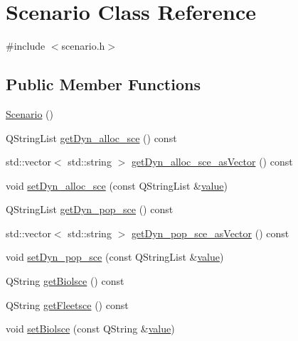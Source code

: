\hypertarget{class_scenario}{}\section{Scenario Class Reference}
\label{class_scenario}


{\ttfamily \#include $<$scenario.\+h$>$}

\subsection*{Public Member Functions}
\begin{DoxyCompactItemize}
\item 
\mbox{\hyperlink{class_scenario_ac81a05dad61b30116332ea971359a41e}{Scenario}} ()
\item 
Q\+String\+List \mbox{\hyperlink{class_scenario_a4a3f15933df62718ca13b64ffee96a08}{get\+Dyn\+\_\+alloc\+\_\+sce}} () const
\item 
std\+::vector$<$ std\+::string $>$ \mbox{\hyperlink{class_scenario_a5257d6eb2ae4e29020f946cd88641294}{get\+Dyn\+\_\+alloc\+\_\+sce\+\_\+as\+Vector}} () const
\item 
void \mbox{\hyperlink{class_scenario_ad3fdb2128204158acb86f67137fffabb}{set\+Dyn\+\_\+alloc\+\_\+sce}} (const Q\+String\+List \&\mbox{\hyperlink{diffusion_8cpp_a4b41795815d9f3d03abfc739e666d5da}{value}})
\item 
Q\+String\+List \mbox{\hyperlink{class_scenario_a1e3a6984825427629b1b48ce38a5e4d4}{get\+Dyn\+\_\+pop\+\_\+sce}} () const
\item 
std\+::vector$<$ std\+::string $>$ \mbox{\hyperlink{class_scenario_a5f1206fac99cc1314adf771a9622167e}{get\+Dyn\+\_\+pop\+\_\+sce\+\_\+as\+Vector}} () const
\item 
void \mbox{\hyperlink{class_scenario_ac7e6718d5d4657af2bd7e14f14b6d40f}{set\+Dyn\+\_\+pop\+\_\+sce}} (const Q\+String\+List \&\mbox{\hyperlink{diffusion_8cpp_a4b41795815d9f3d03abfc739e666d5da}{value}})
\item 
Q\+String \mbox{\hyperlink{class_scenario_aa4eafa61cf1085c9f68f96fd9c94d06a}{get\+Biolsce}} () const
\item 
Q\+String \mbox{\hyperlink{class_scenario_a509ef98e8b5bda3095422a66b9ced0eb}{get\+Fleetsce}} () const
\item 
void \mbox{\hyperlink{class_scenario_ae503354991f933a8a7daf41cb14c47d8}{set\+Biolsce}} (const Q\+String \&\mbox{\hyperlink{diffusion_8cpp_a4b41795815d9f3d03abfc739e666d5da}{value}})
\item 

\end{DoxyCompactItemize}
